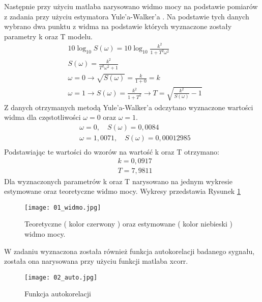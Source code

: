 \documentclass[a4paper,15pt]{article}
\begin{document}
Następnie przy użyciu matlaba narysowano widmo mocy na podstawie pomiarów z zadania przy użyciu estymatora Yule’a-Walker’a . Na podstawie tych danych wybrano dwa punktu z widma na podstawie których wyznaczone zostały parametry k oraz T modelu. 
\begin{align*}
& 10\log _{10} S(\omega) = 10 \log _{10} \frac{k^2}{1+T^2 \omega ^2} \\
& S(\omega ) = \frac{k^2}{T^2 \omega ^2 + 1} \\
& \omega = 0 \rightarrow \sqrt{S(\omega)} = \frac{k}{1+0} = k \\
& \omega = 1 \rightarrow S(\omega) = \frac{k^2}{1+T^2} \rightarrow T = \sqrt{\frac{k^2}{S(\omega)}-1}
\end{align*}
Z danych otrzymanych metodą Yule’a-Walker’a odczytano wyznaczone wartości widma dla częstotliwości \( \omega = 0 \) oraz \( \omega = 1 \).
\begin{align*}
& \omega = 0, \quad S(\omega) = 0,0084 \\
& \omega = 1,0071, \quad S(\omega) = 0,00012985 \\
\end{align*}
Podstawiając te wartości do wzorów na wartość k oraz T otrzymano:
\begin{align*}
& k = 0,0917 \\
& T = 7,9811
\end{align*}
Dla wyznaczonych parametrów k oraz T narysowano na jednym wykresie estymowane oraz teoretyczne widmo mocy. Wykresy przedstawia Rysunek \ref{fig:01_widmo}

\begin{figure}[H]
\centerline{\texttt{[image: 01\_widmo.jpg]}}
\centering
\caption{Teoretyczne ( kolor czerwony ) oraz estymowane ( kolor niebieski ) widmo mocy.}
\label{fig:01_widmo}
\end{figure}

W zadaniu wyznaczona została również funkcja autokorelacji badanego sygnału, została ona narysowana przy użyciu funkcji matlaba xcorr.

\begin{figure}[H]
\centerline{\texttt{[image: 02\_auto.jpg]}}
\centering
\caption{Funkcja autokorelacji}
\label{fig:02_auto}
\end{figure}
\end{document}

